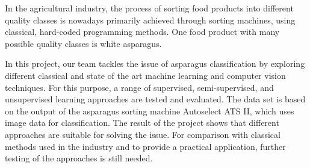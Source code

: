 In the agricultural industry, the process of sorting food products into different quality classes is nowadays primarily achieved through sorting machines, using classical, hard-coded programming methods. One food product with many possible quality classes is white asparagus.

In this project, our team tackles the issue of asparagus classification by exploring different classical and state of the art machine learning and computer vision techniques. For this purpose, a range of supervised, semi-supervised, and unsupervised learning approaches are tested and evaluated. The data set is based on the output of the asparagus sorting machine Autoselect ATS II, which uses image data for classification. The result of the project shows that different approaches are suitable for solving the issue. For comparison with classical methods used in the industry and to provide a practical application, further testing of the approaches is still needed.